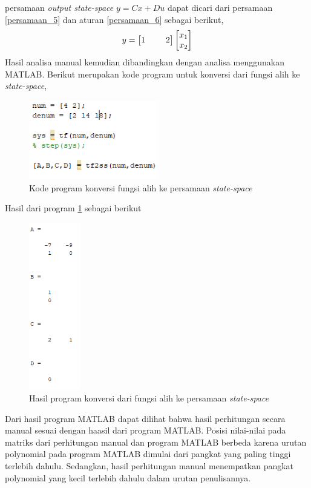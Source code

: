 \documentclass[../cover.tex]{subfiles}
\begin{document}
        persamaan \textit{output state-space} $y=Cx+Du$ dapat dicari dari persamaan \eqref{persamaan_5} dan aturan \eqref{persamaan_6} sebagai berikut,
        \begin{equation}
            \begin{split}
                y=\begin{bmatrix} 1 \hspace{5mm} & 2 \end{bmatrix} \begin{bmatrix} x_1 \\ x_2 \end{bmatrix}
                \label{persamaan_7}
            \end{split}
        \end{equation}
    Hasil analisa manual kemudian dibandingkan dengan analisa menggunakan MATLAB. Berikut merupakan kode program untuk konversi dari fungsi alih ke \textit{state-space},
    \begin{figure}[H]
        \centering
        \includegraphics[width = 0.5\textwidth]{assets/image/kodeMatlab_.png}
        \caption{Kode program konversi fungsi alih ke persamaan \textit{state-space}}
        \label{gambar_7}
    \end{figure}
    Hasil dari program \ref{gambar_7} sebagai berikut
    \begin{figure}[H]
        \centering
        \includegraphics[width = 0.2\textwidth]{assets/image/outSSMatlab_.png}
        \caption{Hasil program konversi dari fungsi alih ke persamaan \textit{state-space}}
        \label{gambar_8}
    \end{figure}
    Dari hasil program MATLAB dapat dilihat bahwa hasil perhitungan secara manual sesuai dengan haasil dari program MATLAB. Posisi nilai-nilai pada matriks dari perhitungan manual dan program MATLAB berbeda karena urutan polynomial pada program MATLAB dimulai dari pangkat yang paling tinggi terlebih dahulu. Sedangkan, hasil perhitungan manual menempatkan pangkat polynomial yang kecil terlebih dahulu dalam urutan penulisannya.
\end{document}
